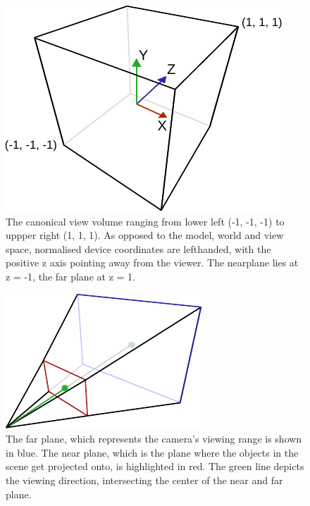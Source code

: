 \begin{figure}
\begin{center}
\includegraphics[scale=0.8]{Images/CanonicalCube.pdf}
\caption{The canonical view volume ranging from lower left (-1, -1, -1) to
uppper right (1, 1, 1). As opposed to the model, world and view space,
normalised device coordinates are lefthanded, with the positive z axis
pointing away from the viewer. The nearplane lies at z = -1, the far plane at z
= 1.}
\label{fig:canonicalviewvolume}
\end{center}
\end{figure}

\begin{figure}
\begin{center}
 \includegraphics[scale=1.0]{Images/Frustum.pdf}
 \caption{The far plane, which represents the camera's viewing range is shown
in blue. The near plane, which is the plane where the objects in the scene get
projected onto, is highlighted in red. The green line depicts the viewing
direction, intersecting the center of the near and far plane.}
 \label{fig:viewfrustum3d}
\end{center} 
\end{figure}

